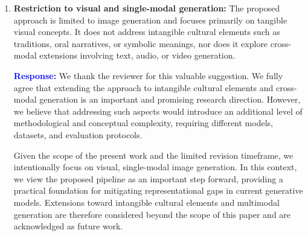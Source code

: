 \documentclass[11pt]{article}
\begin{document}
\begin{enumerate}[label=\textbf{C\arabic*.}, leftmargin=*]
Finally, while automated metrics such as CLIP Score, FID, and KID are used for quantitative evaluation, cultural authenticity is also assessed through qualitative visual inspection, as presented in Figures 1 and 2. These visual analyses allow us to examine whether key cultural attributes are present and correctly represented in the generated images. We fully agree that validation by cultural experts or affected communities would further strengthen this assessment. However, due to time constraints within the review period, such validation could not be conducted. This limitation and the importance of expert-driven evaluation have now been explicitly acknowledged and discussed in the Conclusions section as future work.

We believe these clarifications better position the scope of our contribution and highlight the pipeline’s role as a practical tool for mitigating representational gaps in generative models.

\item \textbf{Restriction to visual and single-modal generation:} The proposed approach is limited to image generation and focuses primarily on tangible visual concepts. It does not address intangible cultural elements such as traditions, oral narratives, or symbolic meanings, nor does it explore cross-modal extensions involving text, audio, or video generation.

\textbf{\textcolor{blue}{Response:}} We thank the reviewer for this valuable suggestion. We fully agree that extending the approach to intangible cultural elements and cross-modal generation is an important and promising research direction. However, we believe that addressing such aspects would introduce an additional level of methodological and conceptual complexity, requiring different models, datasets, and evaluation protocols.

Given the scope of the present work and the limited revision timeframe, we intentionally focus on visual, single-modal image generation. In this context, we view the proposed pipeline as an important step forward, providing a practical foundation for mitigating representational gaps in current generative models. Extensions toward intangible cultural elements and multimodal generation are therefore considered beyond the scope of this paper and are acknowledged as future work.
\end{enumerate}
\end{document}
